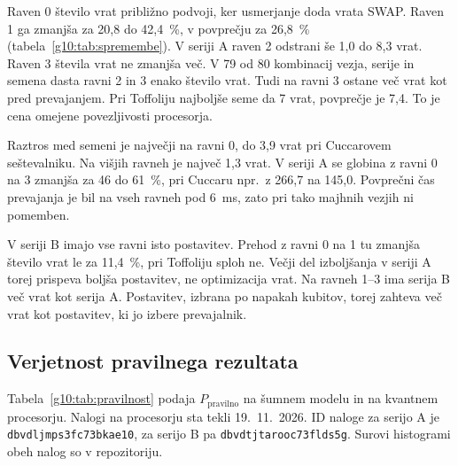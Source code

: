 \documentclass[graybox, envcountchap]{svmult}
\begin{document}
Raven 0 število vrat približno podvoji,
ker usmerjanje doda vrata SWAP.
Raven 1 ga zmanjša za 20,8 do 42,4~\%,
v povprečju za 26,8~\% (tabela~\ref{g10:tab:spremembe}).
V seriji A raven 2 odstrani
še 1,0 do 8,3 vrat.
Raven 3 števila vrat ne zmanjša več.
V 79 od 80 kombinacij vezja, serije in semena
dasta ravni 2 in 3 enako število vrat.
Tudi na ravni 3 ostane več vrat kot pred prevajanjem.
Pri Toffoliju najboljše seme da 7 vrat, povprečje je 7,4.
To je cena omejene povezljivosti procesorja.

Raztros med semeni je največji na ravni 0,
do 3,9 vrat pri Cuccarovem seštevalniku.
Na višjih ravneh je največ 1,3 vrat.
V seriji A se globina z ravni 0 na 3
zmanjša za 46 do 61~\%,
pri Cuccaru npr.\ z 266,7 na 145,0.
Povprečni čas prevajanja je bil
na vseh ravneh pod 6~ms,
zato pri tako majhnih vezjih ni pomemben.

V seriji B imajo vse ravni isto postavitev.
Prehod z ravni 0 na 1 tu zmanjša število vrat
le za 11,4~\%, pri Toffoliju sploh ne.
Večji del izboljšanja v seriji A
torej prispeva boljša postavitev, ne optimizacija vrat.
Na ravneh 1--3 ima serija B
več vrat kot serija A.
Postavitev, izbrana po napakah kubitov,
torej zahteva več vrat kot postavitev,
ki jo izbere prevajalnik.


\subsection{Verjetnost pravilnega rezultata}
\label{g10:sec:rez_pravilnost}

Tabela~\ref{g10:tab:pravilnost} podaja $P_\text{pravilno}$
na šumnem modelu in na kvantnem procesorju.
Nalogi na procesorju sta tekli 19.~11.~2026.
ID naloge za serijo A je \texttt{dbvdljmps3fc73bkae10},
za serijo B pa \texttt{dbvdtjtarooc73flds5g}.
Surovi histogrami obeh nalog so v repozitoriju.
\end{document}
